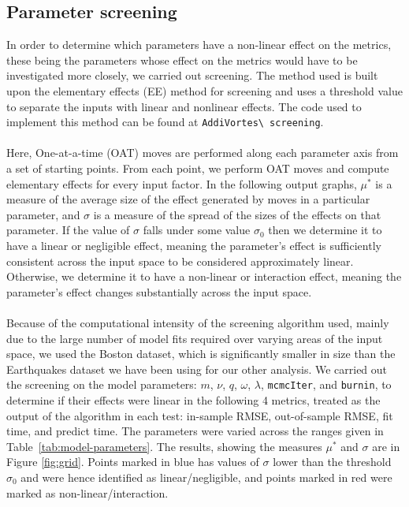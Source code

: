 \documentclass[10pt]{article}
\begin{document}
\subsection{Parameter screening}
In order to determine which parameters have a non-linear effect on the metrics, these being the parameters whose effect on the metrics would have to be investigated more closely, we carried out screening. The method used is built upon the elementary effects (EE) method for screening and uses a threshold value to separate the inputs with linear and nonlinear effects\cite{screening-paper}. The code used to implement this method can be found at \nolinkurl{AddiVortes\ screening}.
\\\\
Here, One-at-a-time (OAT) moves are performed along each parameter axis from a set of starting points. From each point, we perform OAT moves and compute elementary effects for every input factor. In the following output graphs, $\mu^*$ is a measure of the average size of the effect generated by moves in a particular parameter, and $\sigma$ is a measure of the spread of the sizes of the effects on that parameter. If the value of $\sigma$ falls under some value $\sigma_0$ then we determine it to have a linear or negligible effect, meaning the parameter's effect is sufficiently consistent across the input space to be considered approximately linear. Otherwise, we determine it to have a non-linear or interaction effect, meaning the parameter's effect changes substantially across the input space.
\\\\
Because of the computational intensity of the screening algorithm used, mainly due to the large number of model fits required over varying areas of the input space, we used the Boston dataset, which is significantly smaller in size than the Earthquakes dataset we have been using for our other analysis. We carried out the screening on the model parameters: $m$, $\nu$, $q$, $\omega$, $\lambda$, \texttt{mcmcIter}, and \texttt{burnin}, to determine if their effects were linear in the following 4 metrics, treated as the output of the algorithm in each test: in-sample RMSE, out-of-sample RMSE, fit time, and predict time. The parameters were varied across the ranges given in Table~\ref{tab:model-parameters}. The results, showing the measures $\mu^*$ and $\sigma$ are in Figure \ref{fig:grid}. Points marked in blue has values of $\sigma$ lower than the threshold $\sigma_0$ and were hence identified as linear/negligible, and points marked in red were marked as non-linear/interaction.
\end{document}
